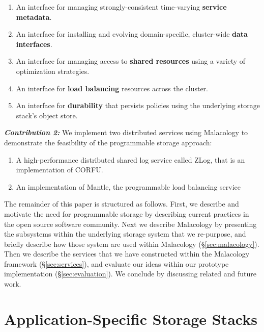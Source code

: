 \documentclass[preprint]{sigplanconf-eurosys}
\begin{document}
\begin{enumerate}

\item An interface for managing strongly-consistent time-varying \textbf{service
metadata}.

\item An interface for installing and evolving domain-specific, cluster-wide
\textbf{data interfaces}.

\item An interface for managing access to \textbf{shared resources} using a
variety of optimization strategies.

\item An interface for \textbf{load balancing} resources across the cluster.

\item An interface for \textbf{durability} that persists policies using the
underlying storage stack's object store.

\end{enumerate}

{\it \textbf{Contribution 2:}} We implement two distributed services using Malacology to
demonstrate the feasibility of the programmable storage approach:

\begin{enumerate}

\item A high-performance distributed shared log service called ZLog, that is an
implementation of CORFU.~\cite{balakrishnan_corfu_2012}

\item An implementation of Mantle, the programmable load balancing
service~\cite{sevilla:sc15-mantle}

\end{enumerate}

The remainder of this paper is structured as follows. First, we describe and
motivate the need for programmable storage by describing current practices in
the open source software community. Next we describe Malacology by presenting the
subsystems within the underlying storage system that we re-purpose, and briefly
describe how those system are used within Malacology (\S\ref{sec:malacology}).
Then we describe the services that we have constructed within the Malacology
framework (\S\ref{sec:services}), and evaluate our ideas within our prototype
implementation (\S\ref{sec:evaluation}).  We conclude by discussing related and future work.

\section{Application-Specific Storage Stacks}
\label{sec:application-specifc-storage-stacks}
\end{document}
